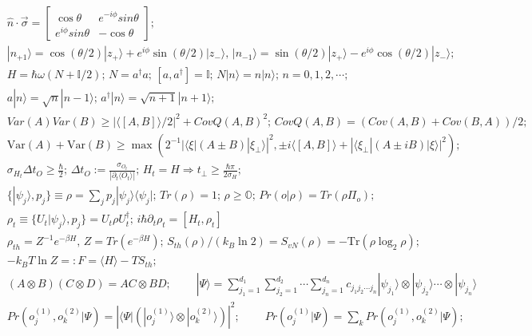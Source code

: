 \documentclass[11pt]{article}
\begin{document}
\begin{align}
& \hat{n}\cdot\vec{\sigma} = \begin{bmatrix} \cos\theta & e^{-i\phi}sin\theta \\ e^{i\phi}sin\theta & -\cos\theta \end{bmatrix} \text{; } \\ 
& |n_{+1}\rangle=\cos(\theta/2)|z_{+}\rangle+e^{i\phi}\sin(\theta/2)|z_{-}\rangle \text{, }|n_{-1}\rangle=\sin(\theta/2)|z_{+}\rangle-e^{i\phi}\cos(\theta/2)|z_{-}\rangle \text{; } \\
& H = \hbar\omega(N+\mathbb{I}/2) \text{; } N=a^{\dagger}a \text{; } [a,a^{\dagger}]=\mathbb{I} \text{; } N|n\rangle=n|n\rangle \text{; } n=0,1,2,\cdots \text{; } \\ 
& a|n\rangle=\sqrt{n}|n-1\rangle \text{; } a^{\dagger}|n\rangle=\sqrt{n+1}|n+1\rangle  \text{; } \\
& Var(A)Var(B)\ge |\langle[A,B]\rangle/2|^{2}+CovQ(A,B)^{2} \text{; } CovQ(A,B)=(Cov(A,B)+Cov(B,A))/2 \text{; } \\
& \mathrm{Var}(A)+\mathrm{Var}(B) \ge \max\left(2^{-1}|\langle\xi|(A\pm B)|\xi_{\perp}\rangle|^{2},\pm i\langle[A,B]\rangle + |\langle\xi_{\perp}|(A\pm iB)|\xi\rangle|^{2}\right)  \text{; } \\
& \sigma_{H_{t}}\Delta t_{O} \ge \frac{\hbar}{2} \text{; } \Delta t_{O} := \frac{\sigma_{O_{t}}}{|\partial_{t}\langle O_{t}\rangle|} \text{; } H_{t}=H\Rightarrow t_{\perp} \ge \frac{\hbar\pi}{2\sigma_{H}}  \text{; } \\
& \{|\psi_{j}\rangle,p_{j}\}\equiv\rho=\sum_{j}p_{j}|\psi_{j}\rangle\langle\psi_{j}| \text{; } Tr(\rho)=1 \text{; } \rho\ge\mathbb{O} \text{; } Pr(o|\rho)=Tr(\rho\Pi_{o})  \text{; } \\ 
& \rho_{t}\equiv\{U_{t}|\psi_{j}\rangle,p_{j}\}=U_{t}\rho U_{t}^{\dagger} \text{; } i\hbar\partial_{t}\rho_{t}=[H_{t},\rho_{t}] \\
& \rho_{th} = Z^{-1}e^{-\beta H} \text{, } Z = Tr(e^{-\beta H}) \text{; } S_{th}(\rho)/(k_{B}\ln 2) = S_{vN}(\rho) = -\mathrm{Tr}(\rho\log_{2}\rho) \text{; } \\ 
& -k_{B}T\ln Z =: F = \langle H\rangle - TS_{th}  \text{; } \\
& (A\otimes B)(C\otimes D)=AC\otimes BD \text{;}\hspace{1cm} |\Psi\rangle = \sum_{j_{1}=1}^{d_{1}}\sum_{j_{2}=1}^{d_{2}}\cdots\sum_{j_{n}=1}^{d_{n}} c_{j_{1}j_{2}\cdots j_{n}} |\psi_{j_{1}}\rangle\otimes|\psi_{j_{2}}\rangle\cdots\otimes|\psi_{j_{n}}\rangle \\
& Pr\left(o_{j}^{(1)},o_{k}^{(2)}|\Psi\right) = \left|\langle\Psi|\left(|o_{j}^{(1)}\rangle\otimes|o_{k}^{(2)}\rangle\right)\right|^{2} \text{;} \hspace{1cm} Pr\left(o_{j}^{(1)}|\Psi\right) = \sum_{k}Pr\left(o_{j}^{(1)},o_{k}^{(2)}|\Psi\right) \text{;} \\

\end{align}
\end{document}
